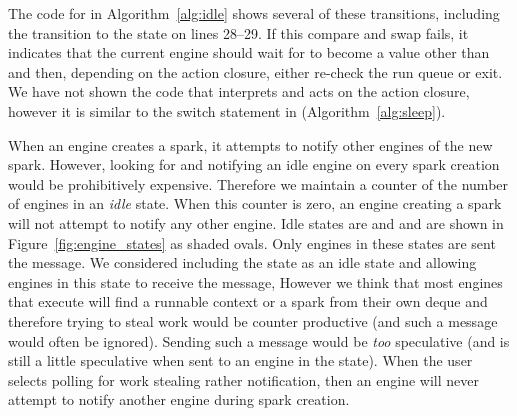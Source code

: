 \noindent
{}
The code for \idle in Algorithm~\ref{alg:idle} shows several of these
transitions,
including the transition to the  state on lines 28--29.
If this compare and swap fails,
it indicates that the current engine should
wait for  to become a value other than  and then,
depending on the action closure,
either re-check the run queue or exit.
We have not shown the code that interprets and acts on the action closure,
however it is similar to the switch statement in \sleep
(Algorithm~\ref{alg:sleep}).

When an engine creates a spark,
it attempts to notify other engines of the new spark.
However, looking for and notifying an idle engine on every spark creation
would be prohibitively expensive.
Therefore we maintain a counter of the number of engines in an \emph{idle}
state.
When this counter is zero, an engine creating a spark will not attempt to
notify any other engine.
Idle states are  and 
and are shown in Figure~\ref{fig:engine_states} as shaded ovals.
Only engines in these states are sent the  message.
We considered including the  state as an idle
state and allowing engines in this state to receive the
 message,
However we think that most engines that execute \idle will find a runnable
context or a spark from their own deque and therefore trying to steal work
would be counter productive (and such a message would often be ignored).
Sending such a message would be \emph{too} speculative
(and is still a little speculative when sent to an engine in the
 state).
When the user selects polling for work stealing rather notification,
then an engine will never attempt to notify another engine during spark
creation.

